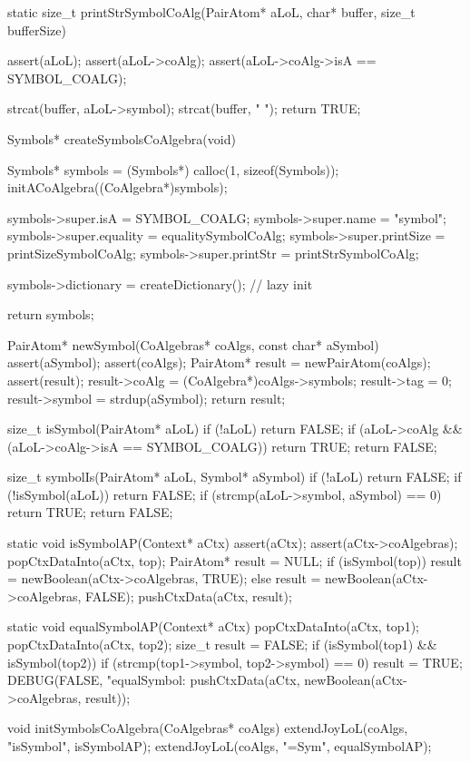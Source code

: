 static size_t printStrSymbolCoAlg(PairAtom* aLoL,
                                  char* buffer, size_t bufferSize) {
  assert(aLoL);
  assert(aLoL->coAlg);
  assert(aLoL->coAlg->isA == SYMBOL_COALG);

  strcat(buffer, aLoL->symbol);
  strcat(buffer, " ");
  return TRUE;
}

Symbols* createSymbolsCoAlgebra(void) {
  Symbols* symbols = (Symbols*) calloc(1, sizeof(Symbols));
  initACoAlgebra((CoAlgebra*)symbols);

  symbols->super.isA       = SYMBOL_COALG;
  symbols->super.name      = "symbol";
  symbols->super.equality  = equalitySymbolCoAlg;
  symbols->super.printSize = printSizeSymbolCoAlg;
  symbols->super.printStr  = printStrSymbolCoAlg;

  symbols->dictionary = createDictionary();     // lazy init

  return symbols;
}

PairAtom* newSymbol(CoAlgebras* coAlgs, const char* aSymbol) {
  assert(aSymbol);
  assert(coAlgs);
  PairAtom* result = newPairAtom(coAlgs);
  assert(result);
  result->coAlg  = (CoAlgebra*)coAlgs->symbols;
  result->tag    = 0;
  result->symbol = strdup(aSymbol);
  return result;
}

size_t isSymbol(PairAtom* aLoL) {
  if (!aLoL) return FALSE;
  if (aLoL->coAlg && (aLoL->coAlg->isA == SYMBOL_COALG)) return TRUE;
  return FALSE;
}

size_t symbolIs(PairAtom* aLoL, Symbol* aSymbol) {
  if (!aLoL) return FALSE;
  if (!isSymbol(aLoL)) return FALSE;
  if (strcmp(aLoL->symbol, aSymbol) == 0) return TRUE;
  return FALSE;
}

static void isSymbolAP(Context* aCtx) {
  assert(aCtx);
  assert(aCtx->coAlgebras);
  popCtxDataInto(aCtx, top);
  PairAtom* result = NULL;
  if (isSymbol(top)) result = newBoolean(aCtx->coAlgebras, TRUE);
  else               result = newBoolean(aCtx->coAlgebras, FALSE);
  pushCtxData(aCtx, result);
}

static void equalSymbolAP(Context* aCtx) {
  popCtxDataInto(aCtx, top1);
  popCtxDataInto(aCtx, top2);
  size_t result = FALSE;
  if (isSymbol(top1) && isSymbol(top2)) {
    if (strcmp(top1->symbol, top2->symbol) == 0) result = TRUE;
  }
  DEBUG(FALSE, "equalSymbol: %
  pushCtxData(aCtx, newBoolean(aCtx->coAlgebras, result));
}

void initSymbolsCoAlgebra(CoAlgebras* coAlgs) {
  extendJoyLoL(coAlgs, "isSymbol", isSymbolAP);
  extendJoyLoL(coAlgs, "=Sym",     equalSymbolAP);
}
\stoptyping

